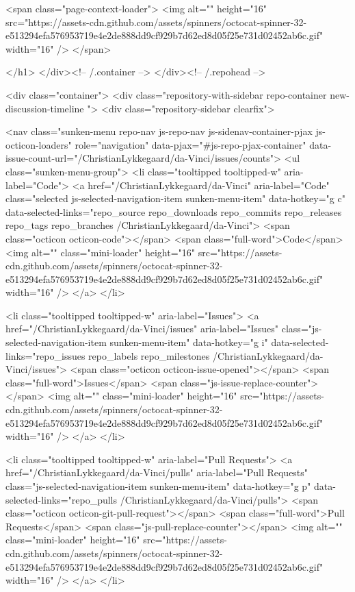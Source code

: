           <span class="page-context-loader">
            <img alt="" height="16" src="https://assets-cdn.github.com/assets/spinners/octocat-spinner-32-e513294efa576953719e4e2de888dd9cf929b7d62ed8d05f25e731d02452ab6c.gif" width="16" />
          </span>

        </h1>
      </div><!-- /.container -->
    </div><!-- /.repohead -->

    <div class="container">
      <div class="repository-with-sidebar repo-container new-discussion-timeline  ">
        <div class="repository-sidebar clearfix">
            
<nav class="sunken-menu repo-nav js-repo-nav js-sidenav-container-pjax js-octicon-loaders"
     role="navigation"
     data-pjax="#js-repo-pjax-container"
     data-issue-count-url="/ChristianLykkegaard/da-Vinci/issues/counts">
  <ul class="sunken-menu-group">
    <li class="tooltipped tooltipped-w" aria-label="Code">
      <a href="/ChristianLykkegaard/da-Vinci" aria-label="Code" class="selected js-selected-navigation-item sunken-menu-item" data-hotkey="g c" data-selected-links="repo_source repo_downloads repo_commits repo_releases repo_tags repo_branches /ChristianLykkegaard/da-Vinci">
        <span class="octicon octicon-code"></span> <span class="full-word">Code</span>
        <img alt="" class="mini-loader" height="16" src="https://assets-cdn.github.com/assets/spinners/octocat-spinner-32-e513294efa576953719e4e2de888dd9cf929b7d62ed8d05f25e731d02452ab6c.gif" width="16" />
</a>    </li>

      <li class="tooltipped tooltipped-w" aria-label="Issues">
        <a href="/ChristianLykkegaard/da-Vinci/issues" aria-label="Issues" class="js-selected-navigation-item sunken-menu-item" data-hotkey="g i" data-selected-links="repo_issues repo_labels repo_milestones /ChristianLykkegaard/da-Vinci/issues">
          <span class="octicon octicon-issue-opened"></span> <span class="full-word">Issues</span>
          <span class="js-issue-replace-counter"></span>
          <img alt="" class="mini-loader" height="16" src="https://assets-cdn.github.com/assets/spinners/octocat-spinner-32-e513294efa576953719e4e2de888dd9cf929b7d62ed8d05f25e731d02452ab6c.gif" width="16" />
</a>      </li>

    <li class="tooltipped tooltipped-w" aria-label="Pull Requests">
      <a href="/ChristianLykkegaard/da-Vinci/pulls" aria-label="Pull Requests" class="js-selected-navigation-item sunken-menu-item" data-hotkey="g p" data-selected-links="repo_pulls /ChristianLykkegaard/da-Vinci/pulls">
          <span class="octicon octicon-git-pull-request"></span> <span class="full-word">Pull Requests</span>
          <span class="js-pull-replace-counter"></span>
          <img alt="" class="mini-loader" height="16" src="https://assets-cdn.github.com/assets/spinners/octocat-spinner-32-e513294efa576953719e4e2de888dd9cf929b7d62ed8d05f25e731d02452ab6c.gif" width="16" />
</a>    </li>


